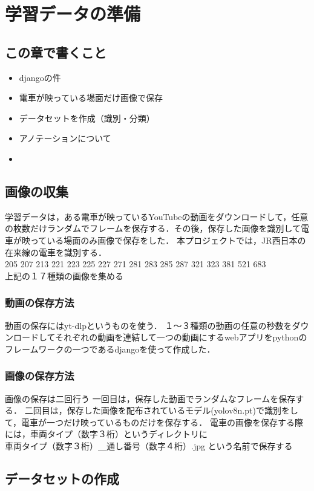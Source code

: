 

\chapter{学習データの準備}\label{genri}
\section{この章で書くこと}
\begin{itemize}
	\item djangoの件
	\item 電車が映っている場面だけ画像で保存
	\item データセットを作成（識別・分類）
	\item アノテーションについて
	\item 
\end{itemize}

\section{画像の収集}
学習データは，ある電車が映っているYouTubeの動画をダウンロードして，任意の枚数だけランダムでフレームを保存する．その後，保存した画像を識別して電車が映っている場面のみ画像で保存をした．
本プロジェクトでは，JR西日本の在来線の電車を識別する．\\
205  207  213  221  223  225  227  271  281  283  285  287  321  323  381  521  683 \\
上記の１７種類の画像を集める
\subsection{動画の保存方法}
動画の保存にはyt-dlpというものを使う．
１〜３種類の動画の任意の秒数をダウンロードしてそれぞれの動画を連結して一つの動画にするwebアプリをpythonのフレームワークの一つであるdjangoを使って作成した．
\subsection{画像の保存方法}
画像の保存は二回行う
一回目は，保存した動画でランダムなフレームを保存する．
二回目は，保存した画像を配布されているモデル(yolov8n.pt)で識別をして，電車が一つだけ映っているものだけを保存する．
電車の画像を保存する際には，車両タイプ（数字３桁）というディレクトリに\\
車両タイプ（数字３桁）＿通し番号（数字４桁）.jpg    という名前で保存する
\section{データセットの作成}
